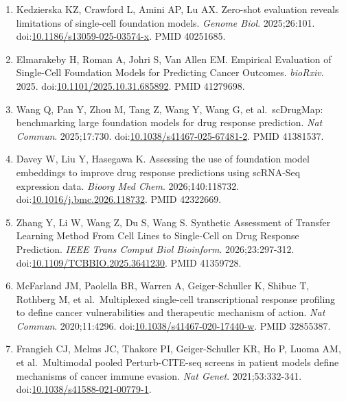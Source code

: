 \documentclass[11pt]{article}
\begin{document}
\begin{enumerate}
  is a More Informative Metric for Assessing the Biological Relevance of
  In Silico Cellular Perturbation Prediction Models. \emph{bioRxiv}.
  2025.
  doi:\href{https://doi.org/10.1101/2025.03.06.641935}{10.1101/2025.03.06.641935}.
  PMID 40161693.
\item
  Kedzierska KZ, Crawford L, Amini AP, Lu AX. Zero-shot evaluation
  reveals limitations of single-cell foundation models. \emph{Genome
  Biol}. 2025;26:101.
  doi:\href{https://doi.org/10.1186/s13059-025-03574-x}{10.1186/s13059-025-03574-x}.
  PMID 40251685.
\item
  Elmarakeby H, Roman A, Johri S, Van Allen EM. Empirical Evaluation of
  Single-Cell Foundation Models for Predicting Cancer Outcomes.
  \emph{bioRxiv}. 2025.
  doi:\href{https://doi.org/10.1101/2025.10.31.685892}{10.1101/2025.10.31.685892}.
  PMID 41279698.
\item
  Wang Q, Pan Y, Zhou M, Tang Z, Wang Y, Wang G, et al.~scDrugMap:
  benchmarking large foundation models for drug response prediction.
  \emph{Nat Commun}. 2025;17:730.
  doi:\href{https://doi.org/10.1038/s41467-025-67481-2}{10.1038/s41467-025-67481-2}.
  PMID 41381537.
\item
  Davey W, Liu Y, Hasegawa K. Assessing the use of foundation model
  embeddings to improve drug response predictions using scRNA-Seq
  expression data. \emph{Bioorg Med Chem}. 2026;140:118732.
  doi:\href{https://doi.org/10.1016/j.bmc.2026.118732}{10.1016/j.bmc.2026.118732}.
  PMID 42322669.
\item
  Zhang Y, Li W, Wang Z, Du S, Wang S. Synthetic Assessment of Transfer
  Learning Method From Cell Lines to Single-Cell on Drug Response
  Prediction. \emph{IEEE Trans Comput Biol Bioinform}. 2026;23:297-312.
  doi:\href{https://doi.org/10.1109/TCBBIO.2025.3641230}{10.1109/TCBBIO.2025.3641230}.
  PMID 41359728.
\item
  McFarland JM, Paolella BR, Warren A, Geiger-Schuller K, Shibue T,
  Rothberg M, et al.~Multiplexed single-cell transcriptional response
  profiling to define cancer vulnerabilities and therapeutic mechanism
  of action. \emph{Nat Commun}. 2020;11:4296.
  doi:\href{https://doi.org/10.1038/s41467-020-17440-w}{10.1038/s41467-020-17440-w}.
  PMID 32855387.
\item
  Frangieh CJ, Melms JC, Thakore PI, Geiger-Schuller KR, Ho P, Luoma AM,
  et al.~Multimodal pooled Perturb-CITE-seq screens in patient models
  define mechanisms of cancer immune evasion. \emph{Nat Genet}.
  2021;53:332-341.
  doi:\href{https://doi.org/10.1038/s41588-021-00779-1}{10.1038/s41588-021-00779-1}.

\end{enumerate}
\end{document}
